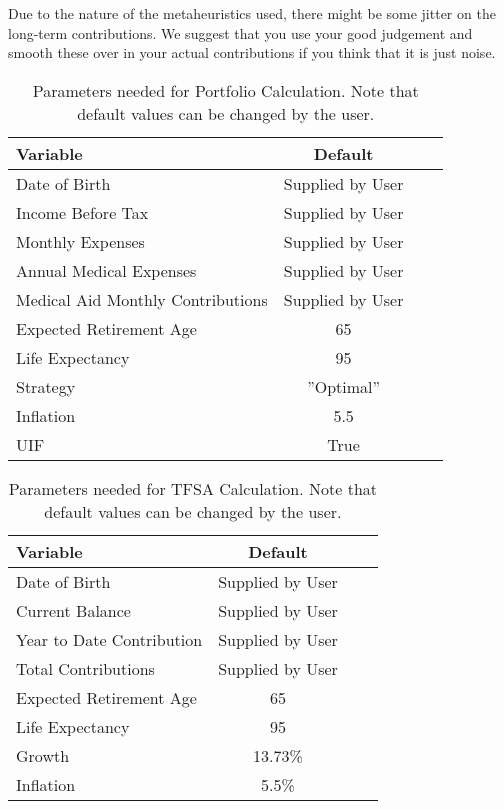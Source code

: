 \documentclass[a4paper, justified]{tufte-handout}
\begin{document}
Due to the nature of the metaheuristics used, there might be some jitter on the long-term contributions. We suggest that you use your good judgement and smooth these over in your actual contributions if you think that it is just noise.
\begin{table}[bt]
	\centering
	\caption{Parameters needed for Portfolio Calculation. Note that default values can be changed by the user.}
	\label{tab:PortfolioParameters}
	\begin{tabular}{lccc}
		\toprule
	\textbf{Variable} 												& \textbf{Default} \\ 
			\midrule
	Date of Birth 										&  Supplied by User\\ 
	Income Before Tax 								&  Supplied by User\\ 
	Monthly Expenses							&  Supplied by User\\ 
	Annual Medical Expenses						&  Supplied by User\\ 
	Medical Aid Monthly Contributions	&  Supplied by User\\ 
	Expected Retirement Age					&65\\
	Life Expectancy										&95\\
	Strategy												&''Optimal''\\
	Inflation													&5.5\\
	UIF															&True\\ 
	\bottomrule
\end{tabular}
\end{table}

\begin{table}[tb]
	\centering
	\caption{Parameters needed for TFSA Calculation. Note that default values can be changed by the user.}
	\label{tab:TFSAParameters}
	\begin{tabular}{lccc}
		\toprule
		\textbf{Variable} 												& \textbf{Default} \\ 
		\midrule
		Date of Birth 										&  Supplied by User\\ 
		Current Balance 								&  Supplied by User\\ 
		Year to Date Contribution							&  Supplied by User\\ 
		Total Contributions						&  Supplied by User\\ 
		Expected Retirement Age	&  65\\ 
		Life Expectancy										&95\\
		Growth												&13.73\%\\
		Inflation													&5.5\%\\
		\bottomrule
	\end{tabular}
\end{table}
\end{document}
